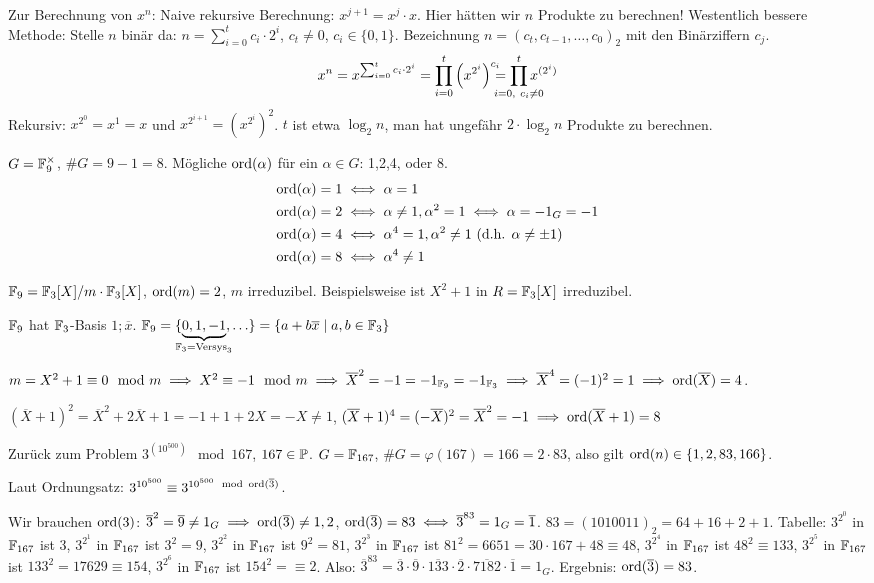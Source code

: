 \documentclass[a4paper,twoside,DIV15,BCOR12mm]{scrbook}
\begin{document}
Zur Berechnung von $x^n$: Naive rekursive Berechnung: $x^{j+1} =
x^j\cdot x$. Hier hätten wir $n$ Produkte zu berechnen! Westentlich
bessere Methode: Stelle $n$ binär da: $n = \sum_{i=0}^t c_i \cdot
2^i$, $c_t\ne 0$, $c_i\in\{0,1\}$. Bezeichnung
$n=(c_t,c_{t-1},\ldots,c_0)_2$ mit den Binärziffern $c_j$.
\[ x^n = x^{ \sum_{i=0}^t c_i \cdot 2^i} = \prod_{i=0}^t \left(x^{2^i} \right)^{\mathrlap{c_i}} = \prod_{\mathclap{i=0,\ c_i\ne 0}}^t x^{(2^i)} \]
Rekursiv: $x^{2^0} = x^1 = x$ und $x^{2^{i+1}} = (x^{2^{i}})^2$. $t$
ist etwa $\log_2 n$, man hat ungefähr $2\cdot\log_2 n$ Produkte zu
berechnen.

\begin{beispiel}
$G=\mathbb{F}_9^\times$, $\#G = 9-1 = 8$. Mögliche $\mathop{\rm ord}\nolimits(\alpha)$ für ein
$\alpha\in G$: 1,2,4, oder 8.
\begin{align*}
\mathop{\rm ord}\nolimits(\alpha) = 1 &\iff \alpha = 1 \\
\mathop{\rm ord}\nolimits(\alpha) = 2 &\iff \alpha \ne 1, \alpha^2 = 1 \iff \alpha = -1_G = -1 \\
\mathop{\rm ord}\nolimits(\alpha) = 4 &\iff \alpha^4  =1 , \alpha^2 \ne 1 \text{ (d.h. $\alpha \ne \pm 1$)} \\
\mathop{\rm ord}\nolimits(\alpha) = 8 &\iff \alpha^4 \ne 1
\end{align*}

$\mathbb{F}_9 = \mathbb{F}_3[X] / m\cdot\mathbb{F}_3[X]$, $\mathop{\rm ord}\nolimits(m)=2$, $m$
irreduzibel. Beispielsweise ist $X^2+1$ in $R=\mathbb{F}_3[X]$
irreduzibel.

$\mathbb{F}_9$ hat $\mathbb{F}_3$-Basis $1;\overline x$. $\MdF_9 =
\{\underbrace{0,1,-1}_{\mathclap{\MdF_3=\text{Versys}_3}},\ldots
\}=\{a+b\overline x\mid a,b\in\MdF_3\}$

$m=X^2+1\equiv 0 \mod m \implies X^2 \equiv -1 \mod m \implies \overline
X^2 = -1 = -1_{\mathbb{F}_9} = -1_{\mathbb{F}_3} \implies \overline X^4 = (-1)^2 =
1 \implies \mathop{\rm ord}\nolimits(\overline X)=4$.

$(\overline X+1)^2 = \overline X^2 + 2\overline X +1 = -1 + 1 + 2X =
-X \ne 1$, $(\overline X+1)^4 = (-\overline X)^2 = \overline X^2 =
-1 \implies {\mathop{\rm ord}\nolimits(\overline X+1)=8}$
\end{beispiel}

Zurück zum Problem $3^{(10^{500})} \mod 167$, $167\in\mathbb{P}$.
$G=\mathbb{F}_{167}$, $\#G=\varphi(167) = 166 = 2\cdot 83$, also gilt
$\mathop{\rm ord}\nolimits(n) \in \{1,2,83,166\}$.

Laut Ordnungsatz: $3^{10^{500}} \equiv 3^{10^{500} \mod
{\mathop{\rm ord}\nolimits}(\overline 3)}$.

Wir brauchen $\mathop{\rm ord}\nolimits(3)$: $\overline 3 ^2 = \overline 9 \ne 1_G \implies
\mathop{\rm ord}\nolimits(\overline 3)\ne 1,2$, $\mathop{\rm ord}\nolimits(\overline 3) = 83 \iff \overline 3
^{83} = 1_G = \overline 1$. $83 = (1010011)_2=64+16+2+1$. Tabelle:
$3^{2^0}$ in $\mathbb{F}_{167}$ ist 3, $3^{2^1}$ in $\mathbb{F}_{167}$ ist
$3^2=9$, $3^{2^2}$ in $\mathbb{F}_{167}$ ist $9^2=81$, $3^{2^3}$ in
$\mathbb{F}_{167}$ ist $81^2 = 6651 = 30\cdot 167+48\equiv 48$, $3^{2^4}$
in $\mathbb{F}_{167}$ ist $48^2 \equiv 133$, $3^{2^5}$ in $\mathbb{F}_{167}$ ist
$133^2 = 17629 \equiv 154$, $3^{2^6}$ in $\mathbb{F}_{167}$ ist $154^2 =
\equiv 2$. Also: $\overline 3 ^{83}  =\overline 3 \cdot \overline 9
\cdot \overline{133} \cdot \overline 2\cdot \overline{7182} \cdot
\overline{1}  =1_G$. Ergebnis: $\mathop{\rm ord}\nolimits(\overline 3)=83$.
\end{document}
